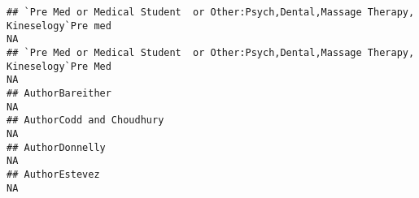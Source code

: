 \documentclass[]{article}
\begin{document}
\begin{verbatim}
## `Pre Med or Medical Student  or Other:Psych,Dental,Massage Therapy, Kineselogy`Pre med                                                                                                                                                                                                                                                                                                                                                                                               NA
## `Pre Med or Medical Student  or Other:Psych,Dental,Massage Therapy, Kineselogy`Pre Med                                                                                                                                                                                                                                                                                                                                                                                               NA
## AuthorBareither                                                                                                                                                                                                                                                                                                                                                                                                                                                                      NA
## AuthorCodd and Choudhury                                                                                                                                                                                                                                                                                                                                                                                                                                                             NA
## AuthorDonnelly                                                                                                                                                                                                                                                                                                                                                                                                                                                                       NA
## AuthorEstevez                                                                                                                                                                                                                                                                                                                                                                                                                                                                        NA

\end{verbatim}
\end{document}
